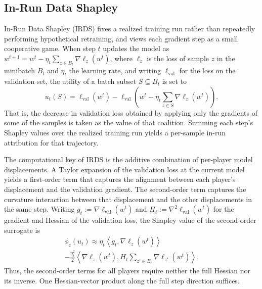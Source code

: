 \documentclass[letterpaper]{article} %
\theoremstyle{definition} %
\newcommand{\lval}{\ell_{\mathrm{val}}} %
\newcommand{\djh}[1]{{\leavevmode\color{magenta}[DJ: #1]}}
\begin{document}
\subsection{In-Run Data Shapley}
\label{sec:irds}

In-Run Data Shapley (IRDS) fixes a realized training run
rather than repeatedly performing hypothetical retraining, and views each
gradient step as a small cooperative game. When step $t$ updates the model as
$w^{t+1}=w^t-\eta_t\sum_{z\in B_t}\nabla\ell_z(w^t)$, where $\ell_z$ is the
loss of sample $z$ in the minibatch $B_t$ and $\eta_t$ the learning rate, and
writing $\lval$ for the loss on the validation set,
the utility of a batch subset $S\subseteq B_t$ is set to
\begin{equation}
\label{eq:irds-utility}
u_t(S)
= \lval(w^t)
- \lval\left(
w^t-\eta_t\textstyle\sum_{z\in S}\nabla\ell_z(w^t)
\right).
\end{equation}
That is, the decrease in validation loss obtained by applying only the
gradients of some of the samples is taken as the value of that coalition.
Summing each step's Shapley values over the realized training run yields a
per-sample in-run attribution for that trajectory.

The computational key of IRDS is the additive combination of per-player model
displacements. A Taylor expansion of the validation loss at the current model
yields a first-order term that captures the alignment between each player's
displacement and the validation gradient. The second-order term captures the
curvature interaction between that displacement and the other displacements
in the same step. Writing
$g_t:=\nabla\lval(w^t)$ and $H_t:=\nabla^2\lval(w^t)$ for the gradient and
Hessian of the validation loss, the Shapley value of the second-order
surrogate is
\begin{multline}
\label{eq:irds-closed}
\phi_z(u_t)
\approx
\eta_t\left\langle g_t,\nabla\ell_z(w^t)\right\rangle\\
-\frac{\eta_t^2}{2}
\left\langle
\nabla\ell_z(w^t),
H_t\textstyle\sum_{z'\in B_t}\nabla\ell_{z'}(w^t)
\right\rangle.
\end{multline}
Thus, the second-order terms for all players require neither the full Hessian
nor its inverse. One Hessian-vector product along the full step direction
suffices.

\end{document}
